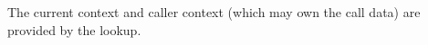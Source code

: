\begin{description}
\[			%
		\]
		\saNote{} The current context and caller context (which may own the call data) are provided by the lookup. 


\end{description}

